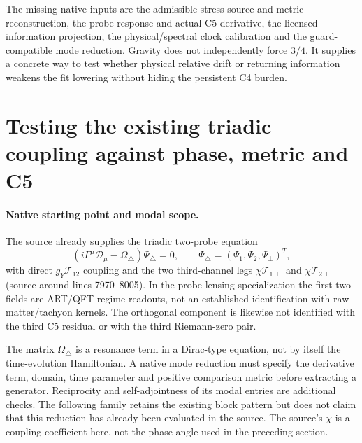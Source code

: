 \documentclass[11pt,a4paper]{article}
\begin{document}
The missing native inputs are the admissible stress source and
metric reconstruction, the probe response and actual C5 derivative,
the licensed information projection, the physical/spectral clock
calibration and the guard-compatible mode reduction. Gravity
does not independently force $3/4$. It supplies a concrete way
to test whether physical relative drift or returning information
weakens the fit lowering without hiding the persistent C4 burden.

\section{Testing the existing triadic coupling against phase, metric and C5}
\label{sec:native-triadic-phase-metric-test}

\paragraph{Native starting point and modal scope.}
The source already supplies the triadic two-probe equation
\[
 (i\Gamma^\mu\mathcal D_\mu-\Omega_\triangle)\Psi_\triangle=0,
 \qquad \Psi_\triangle=(\Psi_1,\Psi_2,\Psi_\perp)^T,
\]
with direct $g_Y\mathcal T_{12}$ coupling and the two third-channel
legs $\chi\mathcal T_{1\perp}$ and $\chi\mathcal T_{2\perp}$
(source around lines 7970--8005). In the probe-lensing specialization
the first two fields are ART/QFT regime readouts, not an established
identification with raw matter/tachyon kernels. The orthogonal
component is likewise not identified with the third C5 residual or
with the third Riemann-zero pair.

The matrix $\Omega_\triangle$ is a resonance term in a Dirac-type
equation, not by itself the time-evolution Hamiltonian. A native
mode reduction must specify the derivative term, domain, time
parameter and positive comparison metric before extracting a
generator. Reciprocity and self-adjointness of its modal entries
are additional checks. The following family retains the existing
block pattern but does not claim that this reduction has already
been evaluated in the source. The source's $\chi$ is a coupling
coefficient here, not the phase angle used in the preceding section.
\end{document}
